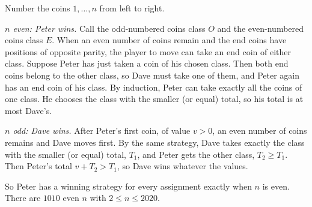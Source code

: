 Number the coins $1,\dots,n$ from left to right.

\emph{$n$ even: Peter wins.} Call the odd-numbered coins class $O$ and the even-numbered coins class $E$. When an even number of coins remain and the end coins have positions of opposite parity, the player to move can take an end coin of either class. Suppose Peter has just taken a coin of his chosen class. Then both end coins belong to the other class, so Dave must take one of them, and Peter again has an end coin of his class. By induction, Peter can take exactly all the coins of one class. He chooses the class with the smaller (or equal) total, so his total is at most Dave's.

\emph{$n$ odd: Dave wins.} After Peter's first coin, of value $v>0$, an even number of coins remains and Dave moves first. By the same strategy, Dave takes exactly the class with the smaller (or equal) total, $T_1$, and Peter gets the other class, $T_2\ge T_1$. Then Peter's total $v+T_2>T_1$, so Dave wins whatever the values.

So Peter has a winning strategy for every assignment exactly when $n$ is even. There are $\boxed{1010}$ even $n$ with $2\le n\le2020$.
